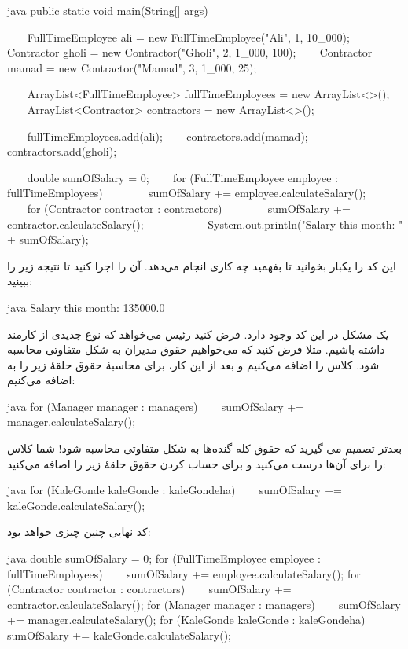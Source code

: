\begin{codebox}{java}
public static void main(String[] args) {  
    FullTimeEmployee ali = new FullTimeEmployee("Ali", 1, 10_000);  
    Contractor gholi = new Contractor("Gholi", 2, 1_000, 100);  
    Contractor mamad = new Contractor("Mamad", 3, 1_000, 25);  
  
    ArrayList<FullTimeEmployee> fullTimeEmployees = new ArrayList<>();  
    ArrayList<Contractor> contractors = new ArrayList<>();  
  
    fullTimeEmployees.add(ali);  
    contractors.add(mamad);  
    contractors.add(gholi);

    double sumOfSalary = 0;
    for (FullTimeEmployee employee : fullTimeEmployees) {  
        sumOfSalary += employee.calculateSalary();  
    }
    for (Contractor contractor : contractors) {  
        sumOfSalary += contractor.calculateSalary();  
    }  
      
    System.out.println("Salary this month: " + sumOfSalary);  
}
\end{codebox}

این کد را یکبار بخوانید تا بفهمید چه کاری انجام می‌دهد. آن را اجرا کنید
تا نتیجه زیر را ببینید:

\begin{codebox}{java}
Salary this month: 135000.0
\end{codebox}

یک مشکل در این کد وجود دارد. فرض کنید رئیس می‌خواهد که نوع جدیدی از
کارمند داشته باشیم. مثلا فرض کنید که می‌خواهیم حقوق مدیران به شکل متفاوتی
محاسبه شود. کلاس  را اضافه می‌کنیم و بعد از این کار،
برای محاسبهٔ حقوق حلقهٔ زیر را به  اضافه می‌کنیم:

\begin{codebox}{java}
for (Manager manager : managers) {  
    sumOfSalary += manager.calculateSalary();  
}
\end{codebox}

بعدتر تصمیم می گیرید که حقوق کله گنده‌ها به شکل متفاوتی محاسبه شود! شما
کلاس  را برای آن‌ها درست می‌کنید و برای حساب کردن
حقوق حلقهٔ زیر را اضافه می‌کنید:

\begin{codebox}{java}
for (KaleGonde kaleGonde : kaleGondeha) {  
    sumOfSalary += kaleGonde.calculateSalary();  
}
\end{codebox}

کد نهایی‌ چنین چیزی خواهد بود:

\begin{codebox}{java}
double sumOfSalary = 0;
for (FullTimeEmployee employee : fullTimeEmployees) {  
    sumOfSalary += employee.calculateSalary();  
}
for (Contractor contractor : contractors) {  
    sumOfSalary += contractor.calculateSalary();  
}
for (Manager manager : managers) {  
    sumOfSalary += manager.calculateSalary();  
}
for (KaleGonde kaleGonde : kaleGondeha) {  
    sumOfSalary += kaleGonde.calculateSalary();  
}
\end{codebox}

